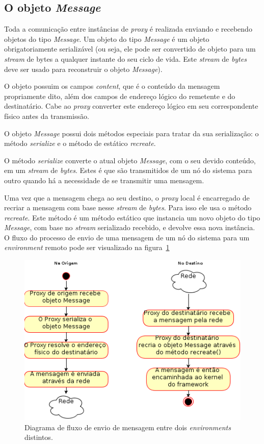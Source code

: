 \subsection{O objeto \emph{Message}}

Toda a comunicação entre instâncias de \textit{proxy} é realizada enviando e recebendo objetos do tipo \textit{Message}. Um objeto do tipo \textit{Message} é um objeto obrigatoriamente serializável (ou seja, ele pode ser convertido de objeto para um \textit{stream} de bytes a qualquer instante do seu ciclo de vida. Este \textit{stream} de \textit{bytes} deve ser usado para reconstruir o objeto \textit{Message}).

O objeto possuim os campos \textit{content}, que é o conteúdo da mensagem propriamente dito, além dos campos de endereço lógico do remetente e do destinatário. Cabe ao \textit{proxy} converter este endereço lógico em seu correspondente físico antes da transmissão.

O objeto \textit{Message} possui dois métodos especiais para tratar da sua serialização: o método \textit{serialize}  e o método de estático \textit{recreate}.

O método \textit{serialize} converte o atual objeto \textit{Message}, com o seu devido conteúdo, em um \textit{stream} de \textit{bytes}. Estes  é que são transmitidos de um nó do sistema para outro quando há a necessidade de se transmitir uma mensagem.

Uma vez que a mensagem chega ao seu destino, o \textit{proxy} local é encarregado de recriar a mensagem com base nesse \textit{stream} de \textit{bytes}. Para isso ele usa o método \textit{recreate}. Este método é um método estático que instancia um novo objeto do tipo \textit{Message}, com base no \textit{stream} serializado recebido, e devolve essa nova instância. O fluxo do processo de envio de uma mensagem de um nó do sistema para um \textit{environment} remoto pode ser visualizado na figura~\ref{fig:fluxo_troca_msg}

\begin{figure}
  \centerline{\includegraphics{fluxo_troca_msg.png}}
  \caption{Diagrama de fluxo de envio de mensagem entre dois \textit{environments} distintos.}
\label{fig:fluxo_troca_msg}
\end{figure}

